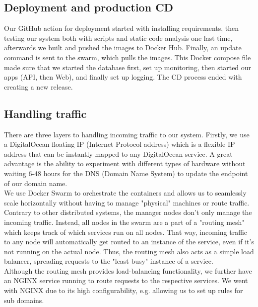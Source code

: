 \documentclass[11pt]{article}
\begin{document}
\subsection{Deployment and production CD}
Our GitHub action for deployment started with installing requirements, then testing our system both with scripts and static code analysis one last time, afterwards we built and pushed the images to Docker Hub. Finally, an update command is sent to the swarm, which pulls the images. This Docker compose file made sure that we started the database first, set up monitoring, then started our apps (API, then Web), and finally set up logging. The CD process ended with creating a new release.
\\

\subsection{Handling traffic}
There are three layers to handling incoming traffic to our system. 
Firstly, we use a DigitalOcean floating IP (Internet Protocol address) which is a flexible IP address that can be instantly mapped to any DigitalOcean service. A great advantage is the ability to experiment with different types of hardware without waiting 6-48 hours for the DNS (Domain Name System) to update the endpoint of our domain name. 
\ \\

\noindent
We use Docker Swarm to orchestrate the containers and allows us to seamlessly scale horizontally without having to manage "physical" machines or route traffic. Contrary to other distributed systems, the manager nodes don't only manage the incoming traffic. Instead, all nodes in the swarm are a part of a "routing mesh" which keeps track of which services run on all nodes. That way, incoming traffic to any node will automatically get routed to an instance of the service, even if it's not running on the actual node. Thus, the routing mesh also acts as a simple load balancer, spreading requests to the "least busy" instance of a service.
\ \\

Although the routing mesh provides load-balancing functionality, we further have an NGINX service running to route requests to the respective services. We went with NGINX due to its high configurability, e.g. allowing us to set up rules for sub domains. 
\end{document}
